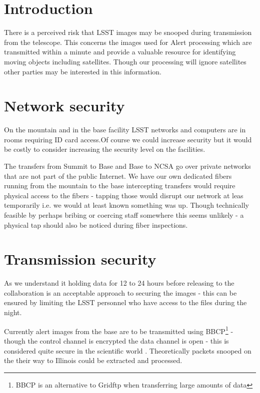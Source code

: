 \section{Introduction} \label{sec:intro}


There is a perceived  risk that LSST  images may be snooped during transmission from the telescope. This concerns the images used for Alert processing which are transmitted within a minute and provide a valuable resource for identifying moving objects including satellites. Though our processing will ignore satellites other parties may be interested in this information.

\section{Network security}\label{sec:net}

On the mountain and in the base facility LSST networks and computers are in rooms requiring ID card access.Of course we could increase security but it would be costly to consider increasing the security level on the facilities.

The transfers from Summit to Base and Base to NCSA go over private networks that are not part of the public Internet. We have our own dedicated fibers running from the mountain to the base 
intercepting transfers would require physical access to the fibers - tapping those would disrupt our network at leas temporarily i.e. we would at least known something was up.  Though technically feasible by perhaps bribing or coercing staff somewhere this seems unlikely - a physical tap should also be noticed during fiber inspections.


\section{Transmission security} \label{sec:trans}
As we understand it holding data for 12 to 24 hours before releasing to the collaboration is an acceptable approach to securing the images - this can be ensured by limiting the LSST personnel who have access to the files during the night.

Currently alert images from the base are to be transmitted using BBCP\footnote{BBCP is an alternative to Gridftp when transferring large amounts of data} - though the control channel is encrypted the data channel is open - this is considered quite secure in the scientific world \citep{bbcp}. Theoretically packets snooped on the their way to Illinois could be extracted and processed.


